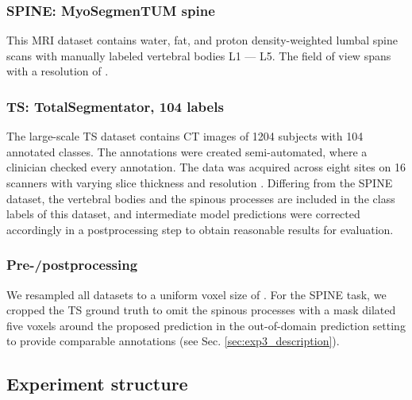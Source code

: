         \subsubsection{SPINE: MyoSegmenTUM spine}
            \label{sec:SPINE_dataset}
            This MRI dataset \cite{burian2019lumbar} contains water, fat, and proton density-weighted lumbal spine scans with manually labeled vertebral bodies L1 --- L5.
            The field of view spans  with a resolution of .

        \subsubsection{TS: TotalSegmentator, 104 labels}
            \label{sec:TS_dataset}
            The large-scale TS dataset contains CT images of 1204 subjects with 104 annotated classes. The annotations were created semi-automated, where a clinician checked every annotation. The data was acquired across eight sites on 16 scanners with varying slice thickness and resolution  \cite{wasserthal2023totalsegmentator}.
            Differing from the SPINE dataset, the vertebral bodies and the spinous processes are included in the class labels of this dataset, and intermediate model predictions were corrected accordingly in a postprocessing step to obtain reasonable results for evaluation.

        \subsubsection{Pre-/postprocessing}
             We resampled all datasets to a uniform voxel size of . For the SPINE task, we cropped the TS ground truth to omit the spinous processes with a mask dilated five voxels around the proposed prediction in the  out-of-domain prediction setting to provide comparable annotations (see Sec. \ref{sec:exp3_description}).

    \subsection{Experiment structure}
